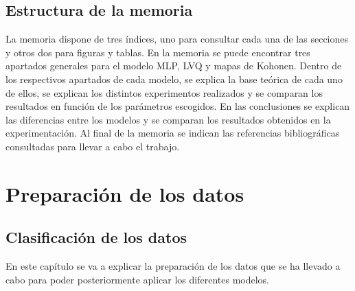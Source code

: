\documentclass[11pt,spanish,listoffigures,listoftables]{workluis}
\begin{document}
\section{Estructura de la memoria}

\par La memoria dispone de tres índices, uno para consultar cada una de las secciones y otros dos para figuras y tablas. En la memoria se puede encontrar tres apartados generales para el modelo MLP, LVQ y mapas de Kohonen. Dentro de los respectivos apartados de cada modelo, se explica la base teórica de cada uno de ellos, se explican los distintos experimentos realizados y se comparan los resultados en función de los parámetros escogidos. En las conclusiones se explican las diferencias entre los modelos y se comparan los resultados obtenidos en la experimentación. Al final de la memoria se indican las referencias bibliográficas consultadas para llevar a cabo el trabajo.





\chapter{Preparación de los datos}

\section{Clasificación de los datos}

\par En este capítulo se va a explicar la preparación de los datos que se ha llevado a cabo para poder posteriormente aplicar los diferentes modelos.
\end{document}
